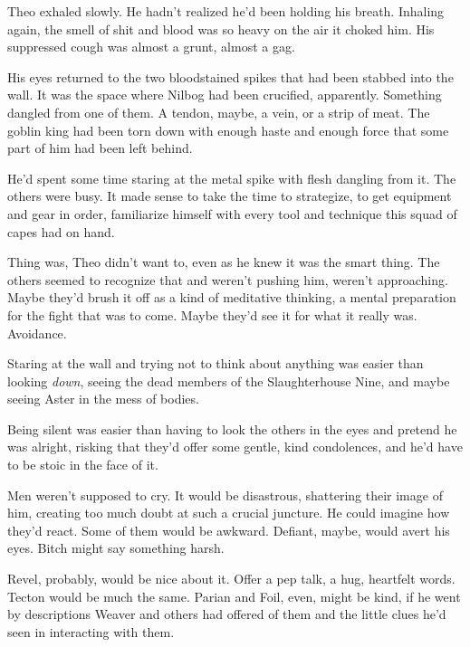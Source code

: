 





Theo exhaled slowly.  He hadn't realized he'd been holding his breath.  Inhaling again, the smell of shit and blood was so heavy on the air it choked him.  His suppressed cough was almost a grunt, almost a gag.



His eyes returned to the two bloodstained spikes that had been stabbed into the wall.  It was the space where Nilbog had been crucified, apparently.  Something dangled from one of them.  A tendon, maybe, a vein, or a strip of meat.  The goblin king had been torn down with enough haste and enough force that some part of him had been left behind.



He'd spent some time staring at the metal spike with flesh dangling from it.  The others were busy.  It made sense to take the time to strategize, to get equipment and gear in order, familiarize himself with every tool and technique this squad of capes had on hand.



Thing was, Theo didn't want to, even as he knew it was the smart thing.  The others seemed to recognize that and weren't pushing him, weren't approaching.  Maybe they'd brush it off as a kind of meditative thinking, a mental preparation for the fight that was to come.  Maybe they'd see it for what it really was.  Avoidance.



Staring at the wall and trying not to think about anything was easier than looking \emph{down}, seeing the dead members of the Slaughterhouse Nine, and maybe seeing Aster in the mess of bodies.



Being silent was easier than having to look the others in the eyes and pretend he was alright, risking that they'd offer some gentle, kind condolences, and he'd have to be stoic in the face of it.



Men weren't supposed to cry.  It would be disastrous, shattering their image of him, creating too much doubt at such a crucial juncture.  He could imagine how they'd react.  Some of them would be awkward.  Defiant, maybe, would avert his eyes.  Bitch might say something harsh.



Revel, probably, would be nice about it.  Offer a pep talk, a hug, heartfelt words.  Tecton would be much the same.  Parian and Foil, even, might be kind, if he went by descriptions Weaver and others had offered of them and the little clues he'd seen in interacting with them.



